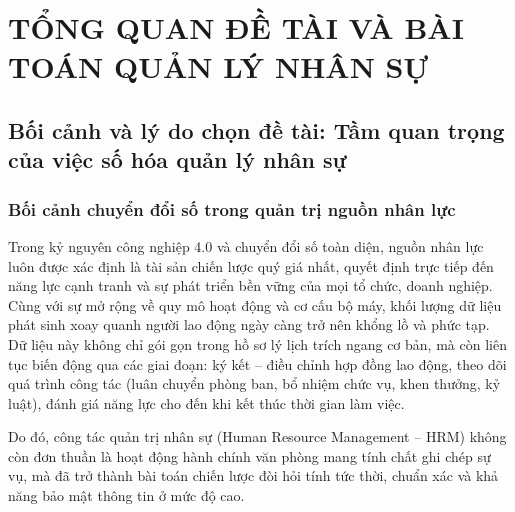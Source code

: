 \documentclass[12pt,a4paper]{report}
\begin{document}
\newpage

\setcounter{page}{1}

\chapter{TỔNG QUAN ĐỀ TÀI VÀ BÀI TOÁN QUẢN LÝ NHÂN SỰ}

\section{Bối cảnh và lý do chọn đề tài: Tầm quan trọng của việc số hóa quản lý nhân sự}

\subsection*{Bối cảnh chuyển đổi số trong quản trị nguồn nhân lực}
Trong kỷ nguyên công nghiệp 4.0 và chuyển đổi số toàn diện, nguồn nhân lực luôn được xác định là tài sản chiến lược quý giá nhất, quyết định trực tiếp đến năng lực cạnh tranh và sự phát triển bền vững của mọi tổ chức, doanh nghiệp. Cùng với sự mở rộng về quy mô hoạt động và cơ cấu bộ máy, khối lượng dữ liệu phát sinh xoay quanh người lao động ngày càng trở nên khổng lồ và phức tạp. Dữ liệu này không chỉ gói gọn trong hồ sơ lý lịch trích ngang cơ bản, mà còn liên tục biến động qua các giai đoạn: ký kết -- điều chỉnh hợp đồng lao động, theo dõi quá trình công tác (luân chuyển phòng ban, bổ nhiệm chức vụ, khen thưởng, kỷ luật), đánh giá năng lực cho đến khi kết thúc thời gian làm việc.

Do đó, công tác quản trị nhân sự (Human Resource Management -- HRM) không còn đơn thuần là hoạt động hành chính văn phòng mang tính chất ghi chép sự vụ, mà đã trở thành bài toán chiến lược đòi hỏi tính tức thời, chuẩn xác và khả năng bảo mật thông tin ở mức độ cao.
\end{document}
